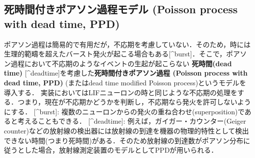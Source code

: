 \subsection{死時間付きポアソン過程モデル (Poisson process with dead time, PPD)}ポアソン過程は簡易的で有用だが，不応期を考慮していない．そのため，時には生理的範疇を超えたバースト発火が起こる場合もある[^burst]．そこで，ポアソン過程において不応期のようなイベントの生起が起こらない \textbf{死時間(dead time)} [^deadtime]を考慮した\textbf{死時間付きポアソン過程 (Poisson process with dead time, PPD)} (またはdead time modified Poisson process)というモデルを導入する．
実装においてはLIFニューロンの時と同じような不応期の処理をする．つまり，現在が不応期かどうかを判断し，不応期なら発火を許可しないようにする．
[^burst]: 複数のニューロンからの発火の重ね合わせ(superposition)であると考えることもできる．
[^deadtime]: 例えば，ガイガー・カウンター(Geiger counter)などの放射線の検出器には放射線の到達を機器の物理的特性として検出できない時間(つまり死時間)がある．そのため放射線の到達数がポアソン分布に従うとした場合，放射線測定装置のモデルとしてPPDが用いられる．